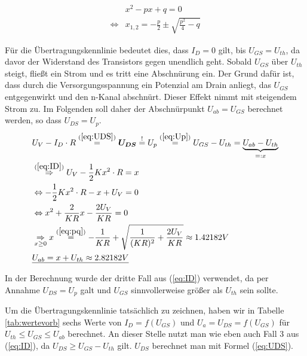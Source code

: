 \documentclass[12pt,a4paper]{scrartcl}
\begin{document}
\begin{align} \label{eq:pq}
    & x^2 -px +q = 0 \nonumber \\
    \Leftrightarrow & x_{1,2} = -\frac{p}{2} \pm \sqrt{\frac{p^2}{4} - q}
\end{align}

F\"ur die \"Ubertragungskennlinie bedeutet dies, dass $I_D = 0$ gilt, bis $U_{GS} = U_{th}$, da davor der Widerstand des Transistors gegen unendlich geht.
Sobald $U_{GS}$ \"uber $U_{th}$ steigt, flie\ss t ein Strom und es tritt eine Abschn\"urung ein.
Der Grund daf\"ur ist, dass durch die Versorgungsspannung ein Potenzial am Drain anliegt, das $U_{GS}$ entgegenwirkt und den n-Kanal abschn\"urt.
Dieser Effekt nimmt mit steigendem Strom zu.
Im Folgenden soll daher der Abschn\"urpunkt $U_{ab} = U_{GS}$ berechnet werden, so dass $U_{DS} = U_p$.
\begin{align*}
&U_V - I_D \cdot R \overset{(\ref{eq:UDS})}{=} \boldsymbol{U_{DS}} \overset{!}{=} U_p \overset{(\ref{eq:Up})}{=} U_{GS} - U_{th} = \underbrace{U_{ab} - U_{th}}_{=:x}\\
&\overset{(\ref{eq:ID})}{\Rightarrow} U_V - \frac{1}{2}Kx^2 \cdot R = x\\
&\Leftrightarrow -\frac{1}{2}Kx^2 \cdot R -x +U_V = 0 \\
&\Leftrightarrow x^2 + \frac{2}{KR}x -\frac{2U_V}{KR} = 0 \\
&\underset{x \geq 0}{\Rightarrow} x \overset{(\ref{eq:pq})}{=} -\frac{1}{KR} + \sqrt{\frac{1}{(KR)^2} + \frac{2U_V}{KR}} \approx 1.42182 V \\
&\underline{U_{ab} = x + U_{th} \approx 2.82182 V}
\end{align*}

In der Berechnung wurde der dritte Fall aus (\ref{eq:ID}) verwendet, da per Annahme $U_{DS} = U_p$ galt und $U_{GS}$ sinnvollerweise gr\"o\ss er als $U_{th}$ sein sollte.

Um die \"Ubertragungskennlinie tats\"achlich zu zeichnen, haben wir in Tabelle \ref{tab:wertevorb} sechs Werte von $I_D = f(U_{GS})$ und $U_a = U_{DS} = f(U_{GS})$ f\"ur $U_{th} \leq U_{GS} \leq U_{ab}$ berechnet.
An dieser Stelle nutzt man wie eben auch Fall 3 aus (\ref{eq:ID}), da $U_{DS} \geq U_{GS} - U_{th}$ gilt.
$U_{DS}$ berechnet man mit Formel (\ref{eq:UDS}).
\end{document}
